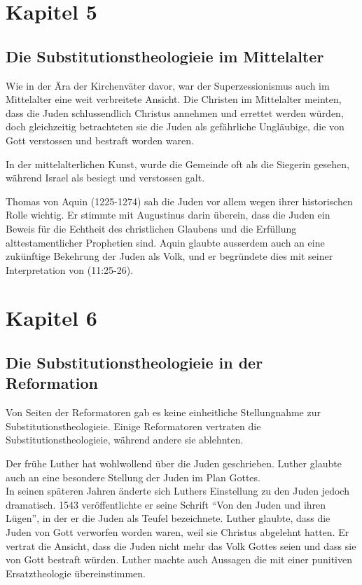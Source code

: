 \documentclass[fontsize=14pt]{../../inc/mybib}
\newcommand{\sz}{Superzessionismus}
\newcommand{\sts}{Substitutionstheologie}
\begin{document}
    \section{Kapitel 5}
    \subsection{Die \sts ie im Mittelalter}
    Wie in der Ära der Kirchenväter davor, war der \sz{} auch im Mittelalter eine weit verbreitete Ansicht. Die Christen im Mittelalter meinten, dass die Juden schlussendlich Christus annehmen und errettet werden würden, doch gleichzeitig betrachteten sie die Juden als gefährliche Ungläubige, die von Gott verstossen und bestraft worden waren.

    In der mittelalterlichen Kunst, wurde die Gemeinde oft als die Siegerin gesehen, während Israel als besiegt und verstossen galt.

    Thomas von Aquin (1225-1274) sah die Juden vor allem wegen ihrer historischen Rolle wichtig. Er stimmte mit Augustinus darin überein, dass die Juden ein Beweis für die Echtheit des christlichen Glaubens und die Erfüllung alttestamentlicher Prophetien sind. Aquin glaubte ausserdem auch an eine zukünftige Bekehrung der Juden als Volk, und er begründete dies mit seiner Interpretation von (11:25-26).
    \section{Kapitel 6}
    \subsection{Die \sts ie in der Reformation}
    Von Seiten der Reformatoren gab es keine einheitliche Stellungnahme zur \sts ie. Einige Reformatoren vertraten die \sts ie, während andere sie ablehnten.

    Der frühe Luther hat wohlwollend über die Juden geschrieben. Luther glaubte auch an eine besondere Stellung der Juden im Plan Gottes.\\
    In seinen späteren Jahren änderte sich Luthers Einstellung zu den Juden jedoch dramatisch. 1543 veröffentlichte er seine Schrift \enquote{Von den Juden und ihren Lügen}, in der er die Juden als Teufel bezeichnete. Luther glaubte, dass die Juden von Gott verworfen worden waren, weil sie Christus abgelehnt hatten. Er vertrat die Ansicht, dass die Juden nicht mehr das Volk Gottes seien und dass sie von Gott bestraft würden. Luther machte auch Aussagen die mit einer punitiven Ersatztheologie übereinstimmen.
\end{document}
